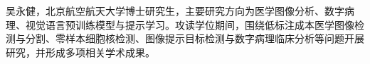 \biography

吴永健，北京航空航天大学博士研究生，主要研究方向为医学图像分析、数字病理、视觉语言预训练模型与提示学习。攻读学位期间，围绕低标注成本医学图像检测与分割、零样本细胞核检测、图像提示目标检测与数字病理临床分析等问题开展研究，并形成多项相关学术成果。
